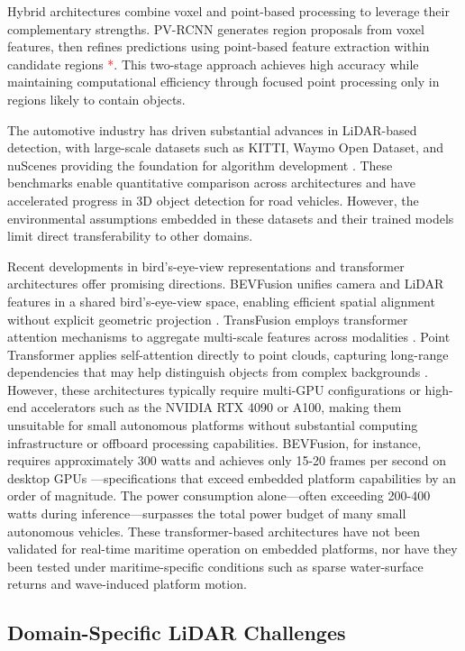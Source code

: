 \documentclass[../main.tex]{subfiles}
\begin{document}
Hybrid architectures combine voxel and point-based processing to leverage their complementary strengths. PV-RCNN generates region proposals from voxel features, then refines predictions using point-based feature extraction within candidate regions \textcolor{red}{*}. This two-stage approach achieves high accuracy while maintaining computational efficiency through focused point processing only in regions likely to contain objects.

The automotive industry has driven substantial advances in LiDAR-based detection, with large-scale datasets such as KITTI, Waymo Open Dataset, and nuScenes providing the foundation for algorithm development \cite{geiger2012}. These benchmarks enable quantitative comparison across architectures and have accelerated progress in 3D object detection for road vehicles. However, the environmental assumptions embedded in these datasets and their trained models limit direct transferability to other domains.

Recent developments in bird's-eye-view representations and transformer architectures offer promising directions. BEVFusion unifies camera and LiDAR features in a shared bird's-eye-view space, enabling efficient spatial alignment without explicit geometric projection \cite{liang2022, liu2023b}. TransFusion employs transformer attention mechanisms to aggregate multi-scale features across modalities \cite{chitta2023}. Point Transformer applies self-attention directly to point clouds, capturing long-range dependencies that may help distinguish objects from complex backgrounds \cite{vaswani2017}. However, these architectures typically require multi-GPU configurations or high-end accelerators such as the NVIDIA RTX 4090 or A100, making them unsuitable for small autonomous platforms without substantial computing infrastructure or offboard processing capabilities. BEVFusion, for instance, requires approximately 300 watts and achieves only 15-20 frames per second on desktop GPUs \cite{liang2022}—specifications that exceed embedded platform capabilities by an order of magnitude. The power consumption alone—often exceeding 200-400 watts during inference—surpasses the total power budget of many small autonomous vehicles. These transformer-based architectures have not been validated for real-time maritime operation on embedded platforms, nor have they been tested under maritime-specific conditions such as sparse water-surface returns and wave-induced platform motion.

\subsection{Domain-Specific LiDAR Challenges}
\end{document}
